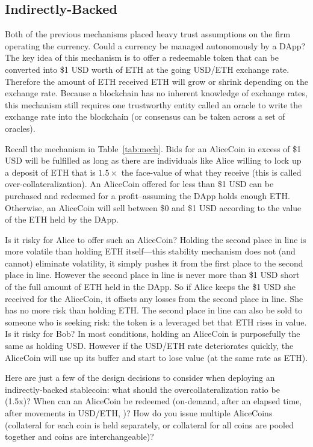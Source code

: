 \subsection{Indirectly-Backed}
\label{sec:dai}

Both of the previous mechanisms placed heavy trust assumptions on the firm operating the currency. Could a currency be managed autonomously by a DApp? The key idea of this mechanism is to offer a redeemable token that can be converted into \$1 USD worth of ETH at the going USD/ETH exchange rate. Therefore the amount of ETH received ETH will grow or shrink depending on the exchange rate. Because a blockchain has no inherent knowledge of exchange rates, this mechanism still requires one trustworthy entity called an oracle to write the exchange rate into the blockchain (or consensus can be taken across a set of oracles).

Recall the mechanism in Table~\ref{tab:mech}. Bids for an AliceCoin in excess of \$1 USD will be fulfilled as long as there are individuals like Alice willing to lock up a deposit of ETH that is $1.5\times$ the face-value of what they receive (this is called over-collateralization). An AliceCoin offered for less than \$1 USD can be purchased and redeemed for a profit--assuming the DApp holds enough ETH. Otherwise, an AliceCoin will sell between \$0 and \$1 USD according to the value of the ETH held by the DApp. 

Is it risky for Alice to offer such an AliceCoin? Holding the second place in line is more volatile than holding ETH itself---this stability mechanism does not (and cannot) eliminate volatility, it simply pushes it from the first place to the second place in line. However the second place in line is never more than \$1 USD short of the full amount of ETH held in the DApp. So if Alice keeps the \$1 USD she received for the AliceCoin, it offsets any losses from the second place in line. She has no more risk than holding ETH. The second place in line can also be sold to someone who is seeking risk: the token is a leveraged bet that ETH rises in value. Is it risky for Bob? In most conditions, holding an AliceCoin is purposefully the same as holding USD. However if the USD/ETH rate deteriorates quickly, the AliceCoin will use up its buffer and start to lose value (at the same rate as ETH).

Here are just a few of the design decisions to consider when deploying an indirectly-backed stablecoin: what should the overcollateralization ratio be (\eg 1.5x)? When can an AliceCoin be redeemed (\eg on-demand, after an elapsed time, after movements in USD/ETH, \etc)? How do you issue multiple AliceCoins (\eg collateral for each coin is held separately, or collateral for all coins are pooled together and coins are interchangeable)?

